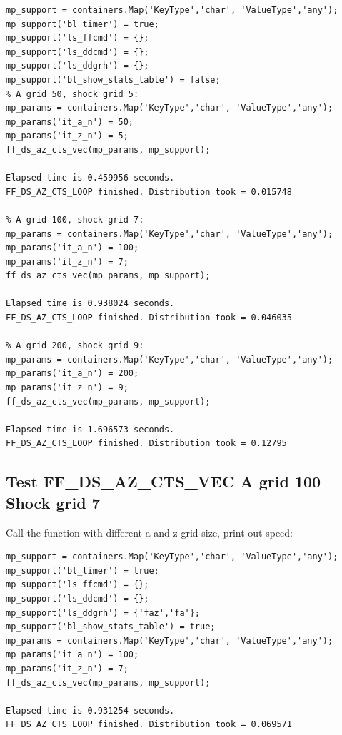 \documentclass[
]{book}
\begin{document}
\begin{verbatim}
mp_support = containers.Map('KeyType','char', 'ValueType','any');
mp_support('bl_timer') = true;
mp_support('ls_ffcmd') = {};
mp_support('ls_ddcmd') = {};
mp_support('ls_ddgrh') = {};
mp_support('bl_show_stats_table') = false;
% A grid 50, shock grid 5:
mp_params = containers.Map('KeyType','char', 'ValueType','any');
mp_params('it_a_n') = 50;
mp_params('it_z_n') = 5;
ff_ds_az_cts_vec(mp_params, mp_support);

Elapsed time is 0.459956 seconds.
FF_DS_AZ_CTS_LOOP finished. Distribution took = 0.015748

% A grid 100, shock grid 7:
mp_params = containers.Map('KeyType','char', 'ValueType','any');
mp_params('it_a_n') = 100;
mp_params('it_z_n') = 7;
ff_ds_az_cts_vec(mp_params, mp_support);

Elapsed time is 0.938024 seconds.
FF_DS_AZ_CTS_LOOP finished. Distribution took = 0.046035

% A grid 200, shock grid 9:
mp_params = containers.Map('KeyType','char', 'ValueType','any');
mp_params('it_a_n') = 200;
mp_params('it_z_n') = 9;
ff_ds_az_cts_vec(mp_params, mp_support);

Elapsed time is 1.696573 seconds.
FF_DS_AZ_CTS_LOOP finished. Distribution took = 0.12795
\end{verbatim}

\hypertarget{test-ff_ds_az_cts_vec-a-grid-100-shock-grid-7}{%
\subsection{Test FF\_DS\_AZ\_CTS\_VEC A grid 100 Shock grid 7}\label{test-ff_ds_az_cts_vec-a-grid-100-shock-grid-7}}

Call the function with different a and z grid size, print out speed:

\begin{verbatim}
mp_support = containers.Map('KeyType','char', 'ValueType','any');
mp_support('bl_timer') = true;
mp_support('ls_ffcmd') = {};
mp_support('ls_ddcmd') = {};
mp_support('ls_ddgrh') = {'faz','fa'};
mp_support('bl_show_stats_table') = true;
mp_params = containers.Map('KeyType','char', 'ValueType','any');
mp_params('it_a_n') = 100;
mp_params('it_z_n') = 7;
ff_ds_az_cts_vec(mp_params, mp_support);

Elapsed time is 0.931254 seconds.
FF_DS_AZ_CTS_LOOP finished. Distribution took = 0.069571
\end{verbatim}
\end{document}
